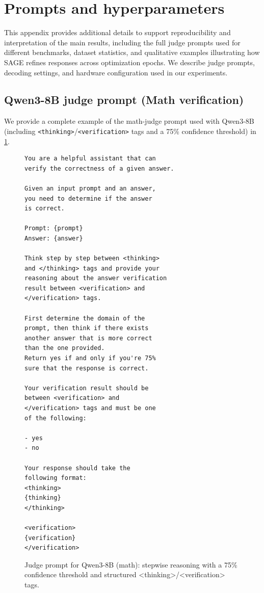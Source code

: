 \documentclass[11pt]{article}
\theoremstyle{plain}
\theoremstyle{definition}
\theoremstyle{remark}
\newcommand{\method}{SAGE}
\begin{document}


\appendix

\section{Prompts and hyperparameters}\label{sec:prompts-and-hyperparameters}
This appendix provides additional details to support reproducibility and interpretation of the main results, including the full judge prompts used for different benchmarks, dataset statistics, and qualitative examples illustrating how \method{} refines responses across optimization epochs. We describe judge prompts, decoding settings, and hardware configuration used in our experiments.

\subsection{Qwen3-8B judge prompt (Math verification)}
We provide a complete example of the math-judge prompt used with Qwen3-8B (including \texttt{<thinking>}/\texttt{<verification>} tags and a 75\% confidence threshold) in \cref{fig:appendix-qwen-math-judge}.


\begin{figure}[h]
\centering
\begin{minipage}{\linewidth}
\begin{small}
\begin{verbatim}
You are a helpful assistant that can
verify the correctness of a given answer.

Given an input prompt and an answer,
you need to determine if the answer
is correct.

Prompt: {prompt}
Answer: {answer}

Think step by step between <thinking>
and </thinking> tags and provide your
reasoning about the answer verification
result between <verification> and
</verification> tags.

First determine the domain of the
prompt, then think if there exists
another answer that is more correct
than the one provided.
Return yes if and only if you're 75%
sure that the response is correct.

Your verification result should be
between <verification> and
</verification> tags and must be one
of the following:

- yes
- no

Your response should take the
following format:
<thinking>
{thinking}
</thinking>

<verification>
{verification}
</verification>
\end{verbatim}
\end{small}
\end{minipage}
\caption{Judge prompt for Qwen3-8B (math): stepwise reasoning with a 75\% confidence threshold and structured <thinking>/<verification> tags.}
\label{fig:appendix-qwen-math-judge}
\end{figure}
\end{document}
